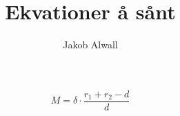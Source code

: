 \documentclass{article}
\author{Jakob Alwall}
\title{Ekvationer å sånt}
\begin{document}
\maketitle
\begin{equation}
  M = \delta \cdot \frac{r_1 + r_2 - d}{d}
\end{equation}
\end{document}

